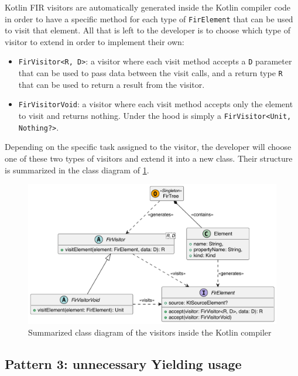 \documentclass[12pt,a4paper,openright,twoside]{book}
\begin{document}
Kotlin \ac{FIR} visitors are automatically generated inside the Kotlin compiler 
code in order to have a specific method for each type of \lstinline{FirElement}
that can be used to visit that element. All that is left to the developer is to
choose which type of visitor to extend in order to implement their own:

\begin{itemize}
  \item \lstinline{FirVisitor<R, D>}: a visitor where each visit method accepts
a \lstinline{D} parameter that can be used to pass data between the visit calls,
and a return type \lstinline{R} that can be used to return a result from the 
visitor.
  \item \lstinline{FirVisitorVoid}: a visitor where each visit method accepts
only the element to visit and returns nothing. Under the hood is simply a 
\lstinline{FirVisitor<Unit, Nothing?>}.
\end{itemize}

Depending on the specific task assigned to the visitor, the developer will
choose one of these two types of visitors and extend it into a new class. Their
structure is summarized in the class diagram of
\cref{fig:fir-visitors-class-diagram}.

\begin{figure}
  \centering
  \includegraphics[width=.7\linewidth]{figures/fir-visitors.pdf}
  \caption{Summarized class diagram of the visitors inside the Kotlin 
  compiler}
  \label{fig:fir-visitors-class-diagram}
\end{figure}

\subsection{Pattern 3: unnecessary Yielding usage}
\end{document}
